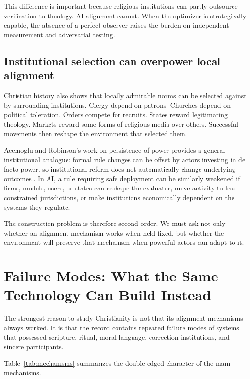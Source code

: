 \documentclass[11pt]{article}
\begin{document}
This difference is important because religious institutions can partly outsource verification to theology. AI alignment cannot. When the optimizer is strategically capable, the absence of a perfect observer raises the burden on independent measurement and adversarial testing.

\subsection{Institutional selection can overpower local alignment}

Christian history also shows that locally admirable norms can be selected against by surrounding institutions. Clergy depend on patrons. Churches depend on political toleration. Orders compete for recruits. States reward legitimating theology. Markets reward some forms of religious media over others. Successful movements then reshape the environment that selected them.

Acemoglu and Robinson's work on persistence of power provides a general institutional analogue: formal rule changes can be offset by actors investing in de facto power, so institutional reform does not automatically change underlying outcomes \parencite{acemoglu2008persistence}. In AI, a rule requiring safe deployment can be similarly weakened if firms, models, users, or states can reshape the evaluator, move activity to less constrained jurisdictions, or make institutions economically dependent on the systems they regulate.

The construction problem is therefore second-order. We must ask not only whether an alignment mechanism works when held fixed, but whether the environment will preserve that mechanism when powerful actors can adapt to it.

\section{Failure Modes: What the Same Technology Can Build Instead}

The strongest reason to study Christianity is not that its alignment mechanisms always worked. It is that the record contains repeated failure modes of systems that possessed scripture, ritual, moral language, correction institutions, and sincere participants.

Table~\ref{tab:mechanisms} summarizes the double-edged character of the main mechanisms.
\end{document}
